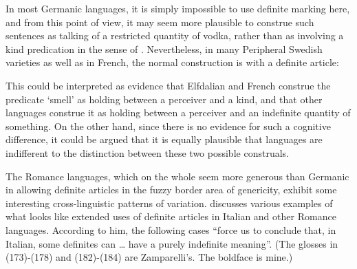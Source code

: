 In most Germanic languages, it is simply impossible to use definite marking here, and from this point of view, it may seem more plausible to construe such sentences as talking of a restricted quantity of vodka, rather than as involving a kind predication in the sense of \citet{KrifkaEtAl1995}. Nevertheless, in many Peripheral Swedish varieties as well as in French, the normal construction is with a definite article: 


\ea \label{} 
\z 
\z

This could be interpreted as evidence that Elfdalian and French construe the predicate ‘smell’ as holding between a perceiver and a kind, and that other languages construe it as holding between a perceiver and an indefinite quantity of something. On the other hand, since there is no evidence for such a cognitive difference, it could be argued that it is equally plausible that languages are indifferent to the distinction between these two possible construals. 


The Romance languages, which on the whole seem more generous than Germanic in allowing definite articles in the fuzzy border area of genericity, exhibit some interesting cross-linguistic patterns of variation. \citet{Zamparelli2002} discusses various examples of what looks like extended uses of definite articles in Italian and other Romance languages. According to him, the following cases “force us to conclude that, in Italian, some definites can … have a purely indefinite meaning”. (The glosses in (173){}-(178) and (182){}-(184) are Zamparelli’s. The boldface is mine.)


